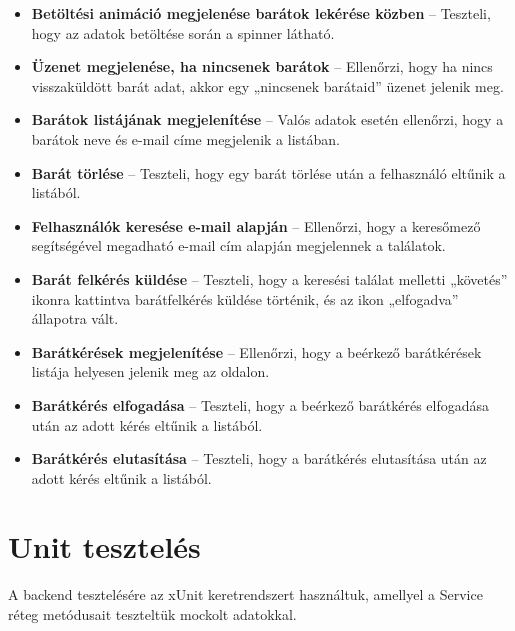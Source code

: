 \documentclass[12pt]{report}
\begin{document}
\begin{itemize}
  \item \textbf{Betöltési animáció megjelenése barátok lekérése közben} – Teszteli, hogy az adatok betöltése során a spinner látható.
  \item \textbf{Üzenet megjelenése, ha nincsenek barátok} – Ellenőrzi, hogy ha nincs visszaküldött barát adat, akkor egy „nincsenek barátaid” üzenet jelenik meg.
  \item \textbf{Barátok listájának megjelenítése} – Valós adatok esetén ellenőrzi, hogy a barátok neve és e-mail címe megjelenik a listában.
  \item \textbf{Barát törlése} – Teszteli, hogy egy barát törlése után a felhasználó eltűnik a listából.
  \item \textbf{Felhasználók keresése e-mail alapján} – Ellenőrzi, hogy a keresőmező segítségével megadható e-mail cím alapján megjelennek a találatok.
  \item \textbf{Barát felkérés küldése} – Teszteli, hogy a keresési találat melletti „követés” ikonra kattintva barátfelkérés küldése történik, és az ikon „elfogadva” állapotra vált.
  \item \textbf{Barátkérések megjelenítése} – Ellenőrzi, hogy a beérkező barátkérések listája helyesen jelenik meg az oldalon.
  \item \textbf{Barátkérés elfogadása} – Teszteli, hogy a beérkező barátkérés elfogadása után az adott kérés eltűnik a listából.
  \item \textbf{Barátkérés elutasítása} – Teszteli, hogy a barátkérés elutasítása után az adott kérés eltűnik a listából.
\end{itemize}

\section{Unit tesztelés}
A backend tesztelésére az xUnit keretrendszert használtuk, amellyel a Service réteg metódusait teszteltük mockolt adatokkal. 
\end{document}
